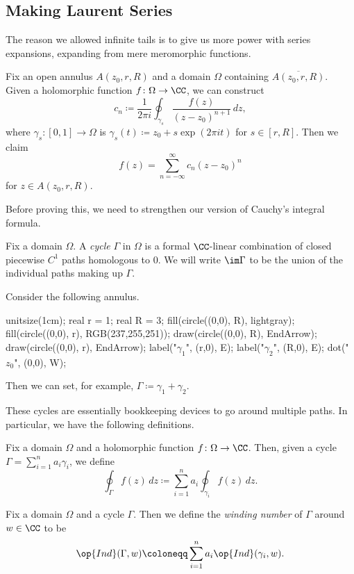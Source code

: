 \subsection{Making Laurent Series}
The reason we allowed infinite tails is to give us more power with series expansions, expanding from mere meromorphic functions.
\begin{theorem} \label{thm:laurent}
	Fix an open annulus $A(z_0,r,R)$ and a domain $\Omega$ containing $\overline{A(z_0,r,R)}$. Given a holomorphic function $f\colon\Omega\to\CC$, we can construct
	\[c_n\coloneqq\frac1{2\pi i}\oint_{\gamma_s}\frac{f(z)}{(z-z_0)^{n+1}}\,dz,\]
	where $\gamma_s\colon[0,1]\to\Omega$ is $\gamma_s(t)\coloneqq z_0+s\exp(2\pi it)$ for $s\in[r,R]$. Then we claim
	\[f(z)=\sum_{n=-\infty}^\infty c_n(z-z_0)^n\]
	for $z\in A(z_0,r,R)$.
\end{theorem}
Before proving this, we need to strengthen our version of Cauchy's integral formula.
\begin{definition}[Cycles]
	Fix a domain $\Omega$. A \textit{cycle} $\Gamma$ in $\Omega$ is a formal $\CC$-linear combination of closed piecewise $C^1$ paths homologous to $0$. We will write $\im\Gamma$ to be the union of the individual paths making up $\Gamma$.
\end{definition}
\begin{example} \label{ex:annuluscycle}
	Consider the following annulus.
	\begin{center}
		\begin{asy}
			unitsize(1cm);
			real r = 1;
			real R = 3;
			fill(circle((0,0), R), lightgray);
			fill(circle((0,0), r), RGB(237,255,251));
			draw(circle((0,0), R), EndArrow);
			draw(circle((0,0), r), EndArrow);
			label("$\gamma_1$", (r,0), E);
			label("$\gamma_2$", (R,0), E);
			dot("$z_0$", (0,0), W);
		\end{asy}
	\end{center}
	Then we can set, for example, $\Gamma\coloneqq\gamma_1+\gamma_2$.
\end{example}
These cycles are essentially bookkeeping devices to go around multiple paths. In particular, we have the following definitions.
\begin{definition}
	Fix a domain $\Omega$ and a holomorphic function $f\colon\Omega\to\CC$. Then, given a cycle $\Gamma=\sum_{i=1}^na_i\gamma_i$, we define
	\[\oint_\Gamma f(z)\,dz\coloneqq\sum_{i=1}^na_i\oint_{\gamma_i}f(z)\,dz.\]
\end{definition}
\begin{definition}
	Fix a domain $\Omega$ and a cycle $\Gamma$. Then we define the \textit{winding number} of $\Gamma$ around $w\in\CC$ to be
	\[\op{Ind}(\Gamma,w)\coloneqq\sum_{i=1}^na_i\op{Ind}(\gamma_i,w).\]
\end{definition}
